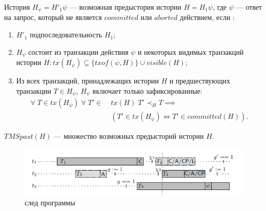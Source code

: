 \begin{mydefinition}\label{possible_past}
История $H_{\psi} = H'_1\psi$ --- возможная предыстория истории $H = H_1\psi$, где $\psi$ --- ответ на запрос, который не является $committed$ или $aborted$ действием, если :
\begin{enumerate}
\item $H'_1$ подпоследовательность $H_1$; \label{poss_past:1}
\item $H_{\psi}$ состоит из транзакции действия $\psi$ и некоторых видимых транзакций истории $H: tx(H_{\psi}) \subseteq \{ txof(\psi, H)\} \cup visible(H)$; \label{poss_past:2}
\item Из всех транзакций, принадлежащих истории $H$ и предшествующих транзакции $T\in H_{\psi}$, $H_{\psi}$ включает только зафиксированные:
\begin{align*}
\forall \; T \in tx(H_{\psi}) \; \forall \; T' \in \; &tx(H) \; T' \prec_H T \implies \\ &(T' \in tx(H_{\psi}) \iff T' \in committed(H)).
\end{align*}\label{poss_past:3}
\end{enumerate}
$TMSpast(H)$ --- множество возможных предысторий истории $H$.
\end{mydefinition}

\begin{figure}
\centering
\includegraphics[width=\textwidth]{img/trace.png}
\caption{\label{fig:trace} след программы} 
\end{figure}

